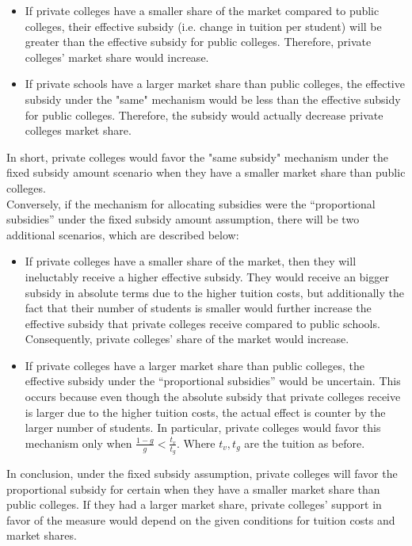 \documentclass[12pt]{paper}
\begin{document}
\begin{itemize}
\item If private colleges have a smaller share of the market compared
  to public colleges, their effective subsidy (i.e. change in tuition
  per student) will be greater than the effective subsidy for public
  colleges. Therefore, private colleges' market share would increase.

\item If private schools have a larger market share than public
  colleges, the effective subsidy under the "same" mechanism would be
  less than the effective subsidy for public colleges. Therefore, the
  subsidy would actually decrease private colleges market share.
\end{itemize}

In short, private colleges would favor the "same subsidy" mechanism
under the fixed subsidy amount scenario when they have a smaller
market share than public colleges.
\\

Conversely, if the mechanism for allocating subsidies were the
``proportional subsidies'' under the fixed subsidy amount assumption,
there will be two additional scenarios, which are described below:

\begin{itemize}
\item If private colleges have a smaller share of the market, then
  they will ineluctably receive a higher effective subsidy. They would
  receive an bigger subsidy in absolute terms due to the higher
  tuition costs, but additionally the fact that their number of
  students is smaller would further increase the effective subsidy
  that private colleges receive compared to public
  schools. Consequently, private colleges' share of the market would
  increase.

\item If private colleges have a larger market share than public
  colleges, the effective subsidy under the ``proportional subsidies''
  would be uncertain. This occurs because even though the absolute
  subsidy that private colleges receive is larger due to the higher
  tuition costs, the actual effect is counter by the larger number of
  students. In particular, private colleges would favor this mechanism
  only when $\frac{1-g}{g} < \frac{t_v}{t_g}$. Where $t_v, t_g$ are
  the tuition as before.
\end{itemize}

In conclusion, under the fixed subsidy assumption, private colleges
will favor the proportional subsidy for certain when they have a
smaller market share than public colleges. If they had a larger market
share, private colleges' support in favor of the measure would depend
on the given conditions for tuition costs and market shares.
\end{document}
